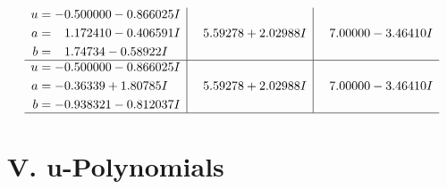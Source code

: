 \documentclass[1p]{elsarticle_modified}
\theoremstyle{definition}
\begin{document}
$$\begin{array}{c|c|c}
\begin{aligned}
u &= -0.500000 - 0.866025 I \\
a &= \phantom{-}1.172410 - 0.406591 I \\
b &= \phantom{-}1.74734 - 0.58922 I\end{aligned}
 & \phantom{-}5.59278 + 2.02988 I & \phantom{-}7.00000 - 3.46410 I \\ \hline\begin{aligned}
u &= -0.500000 - 0.866025 I \\
a &= -0.36339 + 1.80785 I \\
b &= -0.938321 - 0.812037 I\end{aligned}
 & \phantom{-}5.59278 + 2.02988 I & \phantom{-}7.00000 - 3.46410 I\\
 \hline 
 \end{array}$$\newpage
\newpage\renewcommand{\arraystretch}{1}
\centering \section*{ V. u-Polynomials}
\end{document}
